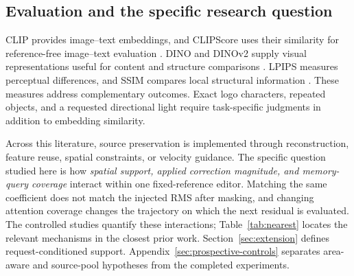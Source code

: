 \subsection{Evaluation and the specific research question}
CLIP provides image--text embeddings, and CLIPScore uses their similarity for reference-free image--text evaluation \cite{radford2021clip,hessel2021clipscore}. DINO and DINOv2 supply visual representations useful for content and structure comparisons \cite{caron2021dino,oquab2024dinov2}. LPIPS measures perceptual differences, and SSIM compares local structural information \cite{zhang2018lpips,wang2004ssim}. These measures address complementary outcomes. Exact logo characters, repeated objects, and a requested directional light require task-specific judgments in addition to embedding similarity.

Across this literature, source preservation is implemented through reconstruction, feature reuse, spatial constraints, or velocity guidance. The specific question studied here is how \emph{spatial support, applied correction magnitude, and memory-query coverage} interact within one fixed-reference editor. Matching the same coefficient does not match the injected RMS after masking, and changing attention coverage changes the trajectory on which the next residual is evaluated. The controlled studies quantify these interactions; Table~\ref{tab:nearest} locates the relevant mechanisms in the closest prior work. Section~\ref{sec:extension} defines request-conditioned support. Appendix~\ref{sec:prospective-controls} separates area-aware and source-pool hypotheses from the completed experiments.

